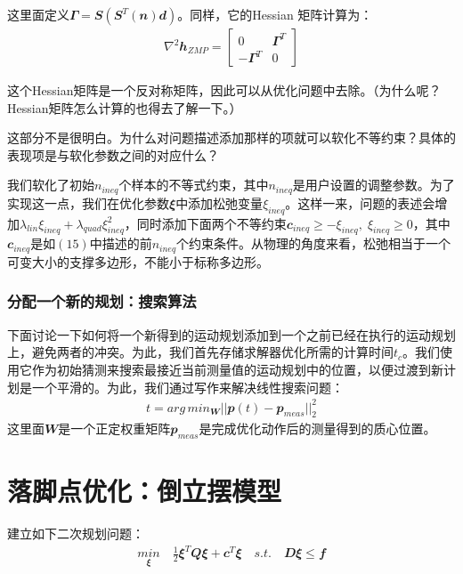 这里面定义${\mathbfit \Gamma}={\mathbfit S}({\mathbfit S}^T({\mathbfit n}){\mathbfit d})$。同样，它的Hessian 矩阵计算为：
\begin{align}
    \nabla^2{\mathbfit h}_{ZMP} = 
    \begin{bmatrix}
    0 & {\mathbfit \Gamma}^T \\
    -{\mathbfit \Gamma}^T & 0
    \end{bmatrix}
\end{align}

这个Hessian矩阵是一个反对称矩阵，因此可以从优化问题中去除。（为什么呢？Hessian矩阵怎么计算的也得去了解一下。）
\begin{note}
    这部分不是很明白。为什么对问题描述添加那样的项就可以软化不等约束？具体的表现项是与软化参数之间的对应什么？
\end{note}

我们软化了初始$n_{ineq}$个样本的不等式约束，其中$n_{ineq}$是用户设置的调整参数。为了实现这一点，我们在优化参数${\mathbfit \xi}$中添加松弛变量$\xi_{ineq}$。这样一来，问题的表述会增加$\lambda_{lin}\xi_{ineq}+\lambda_{quad}\xi_{ineq}^2$，同时添加下面两个不等约束${\mathbfit c}_{ineq} \geq -\xi_{ineq}, \; \xi_{ineq}\geq 0$，其中${\mathbfit c}_{ineq}$是如$(15)$中描述的前$n_{ineq}$个约束条件。从物理的角度来看，松弛相当于一个可变大小的支撑多边形，不能小于标称多边形。

\subsubsection{分配一个新的规划：搜索算法}
下面讨论一下如何将一个新得到的运动规划添加到一个之前已经在执行的运动规划上，避免两者的冲突。为此，我们首先存储求解器优化所需的计算时间$t_c$。我们使用它作为初始猜测来搜索最接近当前测量值的运动规划中的位置，以便过渡到新计划是一个平滑的。为此，我们通过写作来解决线性搜索问题：
\begin{align}
    t= arg\, min_{\mathbfit W}||{\mathbfit p}(t)-{\mathbfit p}_{meas}||_2^2
\end{align}
这里面${\mathbfit W}$是一个正定权重矩阵${\mathbfit p}_{meas}$是完成优化动作后的测量得到的质心位置。

\section{落脚点优化：倒立摆模型}
建立如下二次规划问题：
\begin{align}
    \underset{\mathbfit \xi}{min}\quad \frac{1}{2}{\mathbfit \xi}^T {\mathbfit Q}{\mathbfit \xi}+{\mathbfit c}^T{\mathbfit \xi} \quad s. t. \quad {\mathbfit D}{\mathbfit \xi}\leq {\mathbfit f}
\end{align}

